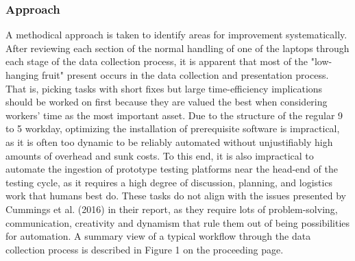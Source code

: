 \documentclass[12pt]{article}
\begin{document}
\subsubsection{Approach}
\indent\hspace{0.5in} A methodical approach is taken to identify areas for improvement systematically. After reviewing each section of the normal handling of one of the laptops through each stage of the data collection process, it is apparent that most of the "low-hanging fruit" present occurs in the data collection and presentation process. That is, picking tasks with short fixes but large time-efficiency implications should be worked on first because they are valued the best when considering workers' time as the most important asset. Due to the structure of the regular 9 to 5 workday, optimizing the installation of prerequisite software is impractical, as it is often too dynamic to be reliably automated without unjustifiably high amounts of overhead and sunk costs. To this end, it is also impractical to automate the ingestion of prototype testing platforms near the head-end of the testing cycle, as it requires a high degree of discussion, planning, and logistics work that humans best do. These tasks do not align with the issues presented by Cummings et al. (2016) in their report, as they require lots of problem-solving, communication, creativity and dynamism that rule them out of being possibilities for automation. A summary view of a typical workflow through the data collection process is described in Figure 1 on the proceeding page.
\newpage
\end{document}
